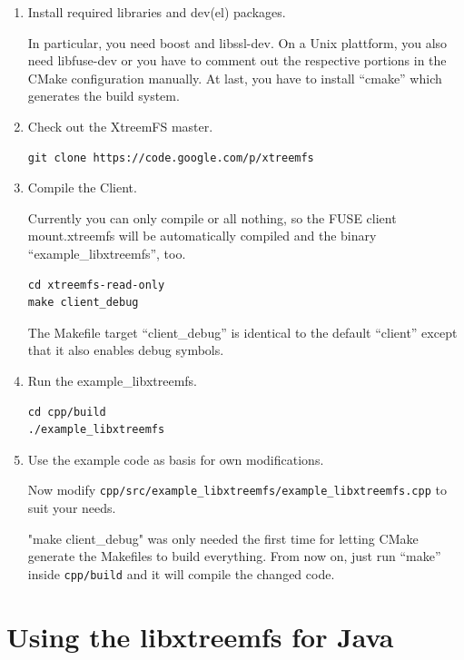 \documentclass[a4paper,10pt]{book}
\begin{document}
\begin{enumerate}
 \item Install required libraries and dev(el) packages.

In particular, you need boost and libssl-dev. On a Unix plattform, you also need libfuse-dev or you have to comment out the respective portions in the CMake configuration manually. At last, you have to install ``cmake'' which generates the build system.

  \item Check out the XtreemFS master.

\begin{verbatim}
git clone https://code.google.com/p/xtreemfs
\end{verbatim}

  \item Compile the Client.

Currently you can only compile or all nothing, so the FUSE client mount.xtreemfs will be automatically compiled and the binary ``example\_libxtreemfs'', too.

\begin{verbatim}
cd xtreemfs-read-only
make client_debug
\end{verbatim}

The Makefile target ``client\_debug'' is identical to the default ``client'' except that it also enables debug symbols.

  \item Run the example\_libxtreemfs.

\begin{verbatim}
cd cpp/build
./example_libxtreemfs
\end{verbatim}

\item Use the example code as basis for own modifications.

Now modify \texttt{cpp/src/example\_libxtreemfs/example\_libxtreemfs.cpp} to suit your needs.

"make client\_debug" was only needed the first time for letting CMake generate the Makefiles to build everything. From now on, just run ``make'' inside \texttt{cpp/build} and it will compile the changed code.

\end{enumerate}

\section{Using the libxtreemfs for Java}
\label{sec:libxtreemfs_for_java}
\end{document}
